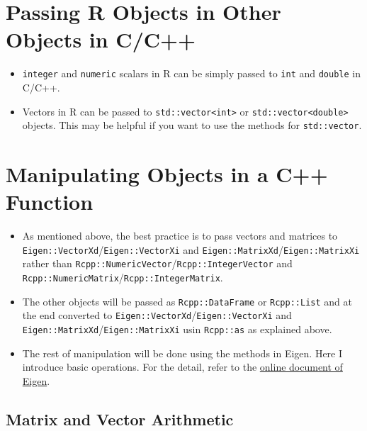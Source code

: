 \documentclass[]{book}
\providecommand{\tightlist}{%
  \setlength{\itemsep}{0pt}\setlength{\parskip}{0pt}}
\begin{document}
\section{Passing R Objects in Other Objects in
C/C++}\label{passing-r-objects-in-other-objects-in-cc}

\begin{itemize}
\tightlist
\item
  \texttt{integer} and \texttt{numeric} scalars in R can be simply
  passed to \texttt{int} and \texttt{double} in C/C++.
\item
  Vectors in R can be passed to
  \texttt{std::vector\textless{}int\textgreater{}} or
  \texttt{std::vector\textless{}double\textgreater{}} objects. This may
  be helpful if you want to use the methods for \texttt{std::vector}.
\end{itemize}

\section{Manipulating Objects in a C++
Function}\label{manipulating-objects-in-a-c-function}

\begin{itemize}
\tightlist
\item
  As mentioned above, the best practice is to pass vectors and matrices
  to \texttt{Eigen::VectorXd}/\texttt{Eigen::VectorXi} and
  \texttt{Eigen::MatrixXd}/\texttt{Eigen::MatrixXi} rather than
  \texttt{Rcpp::NumericVector}/\texttt{Rcpp::IntegerVector} and
  \texttt{Rcpp::NumericMatrix}/\texttt{Rcpp::IntegerMatrix}.
\item
  The other objects will be passed as \texttt{Rcpp::DataFrame} or
  \texttt{Rcpp::List} and at the end converted to
  \texttt{Eigen::VectorXd}/\texttt{Eigen::VectorXi} and
  \texttt{Eigen::MatrixXd}/\texttt{Eigen::MatrixXi} usin
  \texttt{Rcpp::as} as explained above.
\item
  The rest of manipulation will be done using the methods in Eigen. Here
  I introduce basic operations. For the detail, refer to the
  \href{https://eigen.tuxfamily.org/dox/GettingStarted.html}{online
  document of Eigen}.
\end{itemize}

\subsection{Matrix and Vector
Arithmetic}\label{matrix-and-vector-arithmetic}
\end{document}
